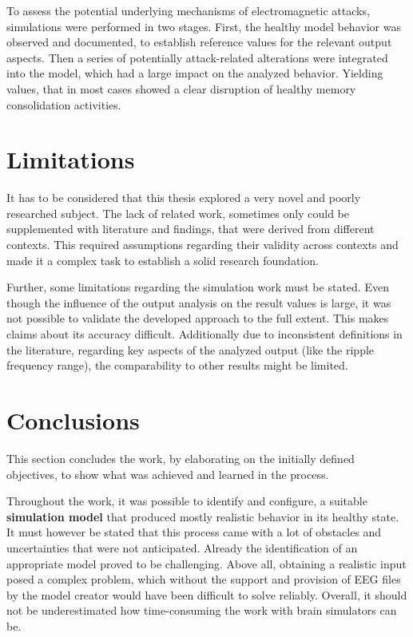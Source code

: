  To assess the potential underlying mechanisms of electromagnetic attacks, simulations were performed in two stages. First, the healthy model behavior was observed and documented, to establish reference values for the relevant output aspects. Then a series of potentially attack-related alterations were integrated into the model, which had a large impact on the analyzed behavior. Yielding values, that in most cases showed a clear disruption of healthy memory consolidation activities.


\section{Limitations}
It has to be considered that this thesis explored a very novel and poorly researched subject. The lack of related work, sometimes only could be supplemented with literature and findings, that were derived from different contexts. This required assumptions regarding their validity across contexts and made it a complex task to establish a solid research foundation.

Further, some limitations regarding the simulation work must be stated. Even though the influence of the output analysis on the result values is large, it was not possible to validate the developed approach to the full extent. This makes claims about its accuracy difficult. Additionally due to inconsistent definitions in the literature, regarding key aspects of the analyzed output (like the ripple frequency range), the comparability to other results might be limited.


\section{Conclusions}
This section concludes the work, by elaborating on the initially defined objectives, to show what was achieved and learned in the process.

Throughout the work, it was possible to identify and configure, a suitable \textbf{simulation model} that produced mostly realistic behavior in its healthy state. It must however be stated that this process came with a lot of obstacles and uncertainties that were not anticipated. Already the identification of an appropriate model proved to be challenging. Above all,  obtaining a realistic input posed a complex problem, which without the support and provision of EEG files by the model creator would have been difficult to solve reliably. Overall, it should not be underestimated how time-consuming the work with brain simulators can be.

